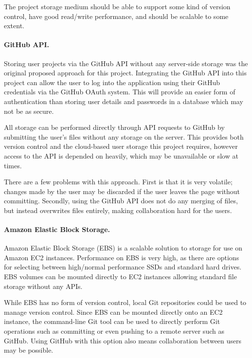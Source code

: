 The project storage medium should be able to support some kind of version control, have good read/write performance, and should be scalable to some extent.

\paragraph{GitHub API.}
Storing user projects via the GitHub API without any server-side storage was the original proposed approach for this project.\cite{githubapi} Integrating the GitHub API into this project can allow the user to log into the application using their GitHub credentials via the GitHub OAuth system. \cite{githuboauth} This will provide an easier form of authentication than storing user details and passwords in a database which may not be as secure.

All storage can be performed directly through API requests to GitHub by submitting the user's files without any storage on the server.\cite{githubapicommit} This provides both version control and the cloud-based user storage this project requires, however access to the API is depended on heavily, which may be unavailable or slow at times.

There are a few problems with this approach. First is that it is very volatile; changes made by the user may be discarded if the user leaves the page without committing. Secondly, using the GitHub API does not do any merging of files, but instead overwrites files entirely, making collaboration hard for the users.

\paragraph{Amazon Elastic Block Storage.}
Amazon Elastic Block Storage (EBS) is a scalable solution to storage for use on Amazon EC2 instances. Performance on EBS is very high, as there are options for selecting between high/normal performance SSDs and standard hard drives. EBS volumes can be mounted directly to EC2 instances allowing standard file storage without any APIs.\cite{awsebs}

While EBS has no form of version control, local Git repositories could be used to manage version control. Since EBS can be mounted directly onto an EC2 instance, the command-line Git tool can be used to directly perform Git operations such as committing or even pushing to a remote server such as GitHub. Using GitHub with this option also means collaboration between users may be possible.

